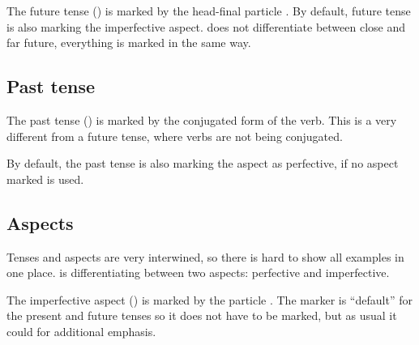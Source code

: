 The future tense (\Fut{}) is marked by the head-final particle . By
default, future tense is also marking the imperfective aspect. \andro does not
differentiate between close and far future, everything is marked in the same
way.




\subsection{Past tense}

The past tense (\Pst{}) is marked by the conjugated form of the verb. This is a
very different from a future tense, where verbs are not being conjugated.


By default, the past tense is also marking the aspect as perfective, if no
aspect marked is used.

\subsection{Aspects}

Tenses and aspects are very interwined, so there is hard to show all examples in
one place. \andro is differentiating between two aspects: perfective and
imperfective.

The imperfective aspect (\Ipfv{}) is marked by the particle . The
marker is ``default'' for the present and future tenses so it does not have to
be marked, but as usual it could for additional emphasis.





